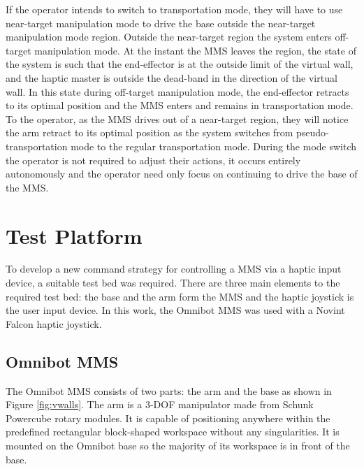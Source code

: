 \documentclass[onecolumn,10pt,final]{asme2ej}
\begin{document}
If the operator intends to switch to transportation mode, they will have to use near-target manipulation mode to drive the base outside the near-target manipulation mode region. Outside the near-target region the system enters off-target manipulation mode. At the instant the MMS leaves the region, the state of the system is such that the end-effector is at the outside limit of the virtual wall, and the haptic master is outside the dead-band in the direction of the virtual wall. In this state during off-target manipulation mode, the end-effector retracts to its optimal position and the MMS enters and remains in transportation mode. To the operator, as the MMS drives out of a near-target region, they will notice the arm retract to its optimal position as the system switches from pseudo-transportation mode to the regular transportation mode. During the mode switch the operator is not required to adjust their actions, it occurs entirely autonomously and the operator need only focus on continuing to drive the base of the MMS.\\


\section{Test Platform}
\label{sec:back}
To develop a new command strategy for controlling a MMS via a haptic input device, a suitable test bed was required. There are three main elements to the required test bed: the base and the arm form the MMS and the haptic joystick is the user input device. In this work, the Omnibot MMS was used with a Novint Falcon haptic joystick.\\

\subsection{Omnibot MMS}
The Omnibot MMS consists of two parts: the arm and the base as shown in Figure \ref{fig:vwalls}. The arm is a 3-DOF manipulator made from Schunk Powercube rotary modules. It is capable of positioning anywhere within the predefined rectangular block-shaped workspace without any singularities. It is mounted on the Omnibot base so the majority of its workspace is in front of the base.\\
\end{document}
